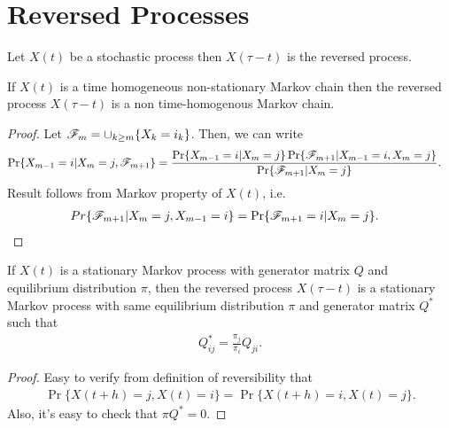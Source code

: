 \documentclass[a4paper,10pt,english]{article}
\begin{document}
\section{Reversed Processes}
\begin{defn} Let $X(t)$ be a stochastic process then $X(\tau-t)$ is the reversed process.
\end{defn}
\begin{lem} If $X(t)$ is a time homogeneous non-stationary Markov chain then the reversed process $X(\tau -t)$ is a non time-homogenous Markov chain.
\end{lem}
\begin{proof} Let $\mathscr{F}_m = \cup_{k \geq m}\{X_k = i_k\}$. Then, we can write
\begin{align*}
\Pr\{X_{m-1}=i|X_m=j,\F_{m+1}\} %
&=\frac{\Pr\{X_{m-1}=i|X_m=j\}\Pr\{\F_{m+1} |X_{m-1}=i,X_m=j \}}{\Pr\{\F_{m+1} |X_m=j\}}.
\end{align*}
Result follows from Markov property of $X(t)$, i.e.
\begin{align*}
Pr\{\mathscr{F}_{m+1} |X_m= j, X_{m-1} = i \} &=\Pr\{\mathscr{F}_{m+1}=i|X_m=j\}.
\end{align*}
\end{proof}

\begin{lem} If $X(t)$ is a stationary Markov process with generator matrix $Q$ and equilibrium distribution $\pi$, then the reversed process $X(\tau -t)$ is a stationary Markov process with same equilibrium distribution $\pi$ and generator matrix $Q^{\ast}$ such that
\begin{align*}
Q^{\ast}_{ij} = \frac{\pi_j}{\pi_i}Q_{ji}.
\end{align*}
\end{lem}
\begin{proof} Easy to verify from definition of reversibility that 
\begin{align*}
\Pr\{X(t+h) = j, X(t) = i\} = \Pr\{X(t+h) = i, X(t) = j\}.
\end{align*}
Also, it's easy to check that $\pi Q^{\ast} = 0$.
\end{proof}
\end{document}

